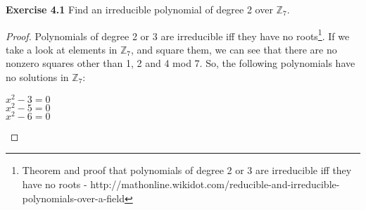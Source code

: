 \documentclass{article}
\newcommand{\subtitle}[1]{%
  \posttitle{%
    \par\end{center}
    \begin{center}\LARGE#1\end{center}
    \vskip0.5em}%
}
\begin{document}
\subtitle{Lecture IV}
\noindent \textbf{Exercise 4.1} Find an irreducible polynomial of degree 2 over $\mathbb{Z}_{7}$.
\begin{proof}
Polynomials of degree 2 or 3 are irreducible iff they have no roots\footnote{Theorem and proof that polynomials of degree 2 or 3 are irreducible iff they have no roots - http://mathonline.wikidot.com/reducible-and-irreducible-polynomials-over-a-field}. If we take a look at elements in $\mathbb{Z}_{7}$, and square them, we can see that there are no nonzero squares other than 1, 2 and 4 mod 7. So, the following polynomials have no solutions in $\mathbb{Z}_{7}$:
\begin{center}
$x^2 - 3 = 0$\\
$x^2 - 5 = 0$\\
$x^2 - 6 = 0$	
\end{center}
\end{proof}
\end{document}
